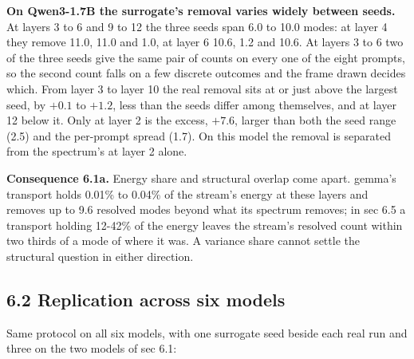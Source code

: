 \documentclass[10pt,letterpaper,twocolumn]{article}
\begin{document}
\textbf{On Qwen3-1.7B the surrogate's removal varies widely between seeds.} At layers 3 to 6 and 9 to
12 the three seeds span 6.0 to 10.0 modes: at layer 4 they remove 11.0, 11.0 and 1.0, at layer 6
10.6, 1.2 and 10.6. At layers 3 to 6 two of the three seeds give the same pair of counts on every
one of the eight prompts, so the second count falls on a few discrete outcomes and the frame drawn
decides which. From layer 3 to layer 10 the real removal sits at or just above the largest seed, by
\(+0.1\) to \(+1.2\), less than the seeds differ among themselves, and at layer 12 below it. Only at
layer 2 is the excess, \(+7.6\), larger than both the seed range (2.5) and the per-prompt spread
(1.7). On this model the removal is separated from the spectrum's at layer 2 alone.

\textbf{Consequence 6.1a.} Energy share and structural overlap come apart. gemma's transport holds 0.01\%
to 0.04\% of the stream's energy at these layers and removes up to 9.6 resolved modes beyond what its
spectrum removes; in sec 6.5 a transport holding 12-42\% of the energy leaves the stream's resolved
count within two thirds of a mode of where it was. A variance share cannot settle the structural
question in either direction.

\subsection{6.2 Replication across six models}\label{62-replication-across-six-models}

Same protocol on all six models, with one surrogate seed beside each real run and three on the two
models of sec 6.1:
\end{document}
